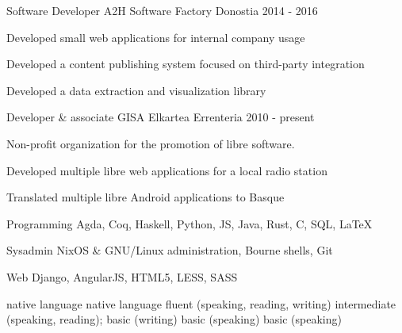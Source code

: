 \documentclass[11pt, a4paper]{awesome-cv}
\begin{document}
\begin{cventries}
    \cventry
      {Software Developer} %
      {A2H Software Factory} %
      {Donostia} %
      {2014 - 2016} %
      {
        \begin{cvitems} %
          \item {Developed small web applications for internal company usage}
          \item {Developed a content publishing system focused on third-party
              integration}
          \item {Developed a data extraction and visualization library}
        \end{cvitems}
      }

    \cventry
      {Developer \& associate} %
      {GISA Elkartea}
      {Errenteria} %
      {2010 - present} %
      {
        Non-profit organization for the promotion of libre
        software.\vspace{1.1\baselineskip}
        \begin{cvitems} %
          \item {Developed multiple libre web applications for a local radio
              station}
          \item {Translated multiple libre Android applications to Basque}
        \end{cvitems}
      }

\end{cventries}

\noindent
\begin{minipage}[t]{0.55\linewidth}
\vspace{0.21\baselineskip}
\begin{cvskills}
    \cvskill
      {Programming} %
      {Agda, Coq, Haskell, Python, JS, Java, Rust, C, SQL, LaTeX} %
  
    \cvskill
      {Sysadmin} %
      {NixOS \& GNU/Linux administration, Bourne shells, Git} %
  
    \cvskill
      {Web} %
      {Django, AngularJS, HTML5, LESS, SASS} %
\end{cvskills}
\end{minipage}%
\hspace{0.05\linewidth}
\begin{minipage}[t]{0.4\linewidth}
\begin{cvskills}
     {native language}
     {native language}
     {fluent (speaking, reading, writing)}
     {
        intermediate (speaking, reading);\newline
        basic (writing)}
     {basic (speaking)}
     {basic (speaking)}
\end{cvskills}
\end{minipage}
\end{document}

